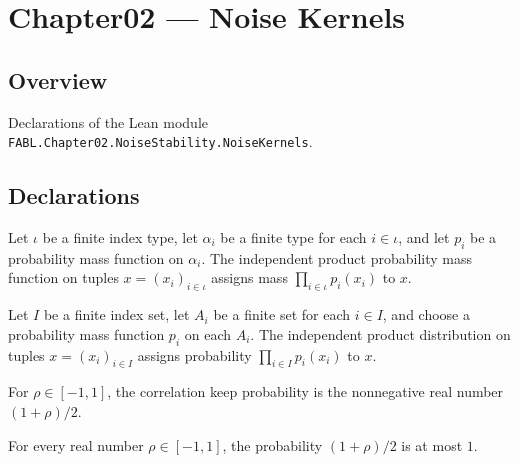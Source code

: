 \chapter{Chapter02 — Noise Kernels}
\section{Overview}

Declarations of the Lean module \texttt{FABL.Chapter02.NoiseStability.NoiseKernels}.

\section{Declarations}

\begin{definition}
\label{FABL.independentProductPMF}
\leanok
Let $\iota$ be a finite index type, let $\alpha_i$ be a finite type for each
$i\in\iota$, and let $p_i$ be a probability mass function on $\alpha_i$. The independent
product probability mass function on tuples $x=(x_i)_{i\in\iota}$ assigns mass
$\prod_{i\in\iota}p_i(x_i)$ to $x$.
\end{definition}

\begin{theorem}
\label{FABL.independentProductPMF_apply}
\leanok
{}
Let $I$ be a finite index set, let $A_i$ be a finite set for each $i\in I$, and choose a
probability mass function $p_i$ on each $A_i$. The independent product distribution on
tuples $x=(x_i)_{i\in I}$ assigns probability $\prod_{i\in I}p_i(x_i)$ to $x$.
\end{theorem}

\begin{definition}
\label{FABL.correlationKeepProbability}
\leanok
For $\rho\in[-1,1]$, the correlation keep probability is the nonnegative real number
$(1+\rho)/2$.
\end{definition}

\begin{theorem}
\label{FABL.correlationKeepProbability_le_one}
\leanok
{}
For every real number $\rho\in[-1,1]$, the probability $(1+\rho)/2$ is at most $1$.
\end{theorem}

